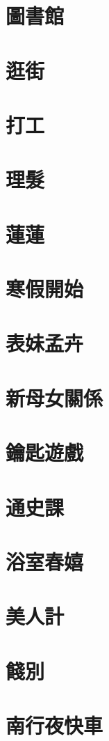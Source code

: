 \chapter{圖書館}
\chapter{逛街}
\chapter{打工}
\chapter{理髮}
\chapter{蓮蓮}
\chapter{寒假開始}
\chapter{表妹孟卉}
\chapter{新母女關係}
\chapter{鑰匙遊戲}
\chapter{通史課}
\chapter{浴室春嬉}
\chapter{美人計}
\chapter{餞別}
\chapter{南行夜快車}
